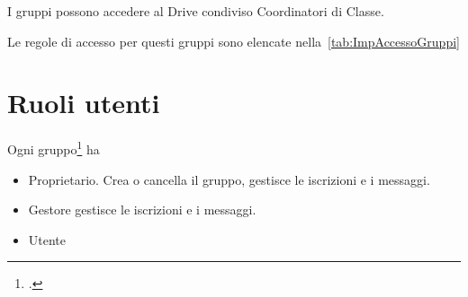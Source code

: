 I gruppi possono accedere al Drive condiviso Coordinatori di Classe.

Le  regole di accesso per questi gruppi sono elencate nella~\cref{tab:ImpAccessoGruppi}
\section{Ruoli utenti}
Ogni gruppo\footcite{Google2023e} ha 
\begin{itemize}
	\item Proprietario. Crea o cancella il gruppo, gestisce le iscrizioni e i messaggi. 
	\item Gestore gestisce le iscrizioni e i messaggi. 
	\item Utente
\end{itemize}
